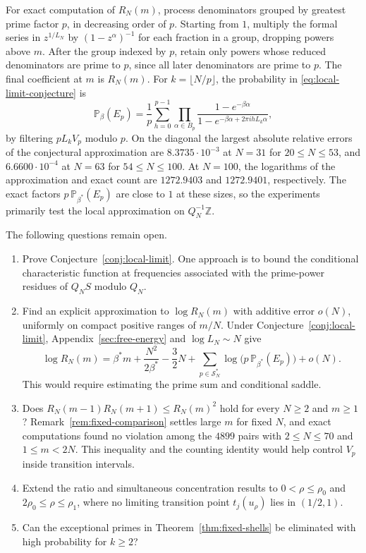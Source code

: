 \documentclass[11pt]{amsart}
\theoremstyle{remark}
\newcommand{\Pp}{\mathbb P}
\newcommand{\Z}{\mathbb Z}
\begin{document}
For exact computation of \(R_N(m)\), process denominators grouped by
greatest prime factor \(p\), in decreasing order of \(p\).
Starting from \(1\), multiply the formal series in \(z^{1/L_N}\)
by \((1-z^\alpha)^{-1}\) for each fraction
in a group, dropping powers above \(m\). After the group indexed by
\(p\), retain only powers whose reduced denominators are prime to \(p\),
since all later denominators are prime to \(p\). The final coefficient
at \(m\) is \(R_N(m)\). For \(k=\lfloor N/p\rfloor\), the probability
in \eqref{eq:local-limit-conjecture} is
\[
 \Pp_\beta(E_p)=\frac1p\sum_{h=0}^{p-1}
  \prod_{\alpha\in B_p}
  \frac{1-e^{-\beta\alpha}}{1-e^{-\beta\alpha+2\pi i hL_k\alpha}},
\]
by filtering \(pL_kV_p\) modulo \(p\).
On the diagonal the largest absolute relative errors of the
conjectural approximation are \(8.3735\cdot10^{-3}\) at \(N=31\)
for \(20\le N\le53\), and \(6.6600\cdot10^{-4}\) at \(N=63\) for
\(54\le N\le100\). At \(N=100\), the logarithms of the approximation
and exact count are \(1272.9403\) and \(1272.9401\), respectively.
The exact factors \(p\,\Pp_{\beta^\ast}(E_p)\) are close to \(1\) at
these sizes, so the experiments primarily test the local approximation
on \(Q_N^{-1}\Z\).

The following questions remain open.
\begin{enumerate}
\item Prove Conjecture~\ref{conj:local-limit}. One approach is to bound
the conditional characteristic function at frequencies associated
with the prime-power residues of \(Q_NS\) modulo \(Q_N\).
\item Find an explicit approximation to \(\log R_N(m)\) with additive
error \(o(N)\), uniformly on compact positive ranges of \(m/N\).
Under Conjecture~\ref{conj:local-limit}, Appendix~\ref{sec:free-energy} and \(\log L_N\sim N\) give
\[
 \log R_N(m)=\beta^\ast m+\frac{N^2}{2\beta^\ast}-\frac32N+
 \sum_{p\in\mathcal S_N^\ast}\log\!\bigl(p\,\Pp_{\beta^\ast}(E_p)\bigr)+o(N).
\]
This would require estimating the prime sum and conditional saddle.
\item Does \(R_N(m-1)R_N(m+1)\le R_N(m)^2\) hold for every \(N\ge2\)
and \(m\ge1\)? Remark~\ref{rem:fixed-comparison} settles large \(m\) for
fixed \(N\), and exact computations found no violation among the \(4899\)
pairs with \(2\le N\le70\) and \(1\le m<2N\). This inequality and the
counting identity would help control \(V_p\) inside transition intervals.
\item Extend the ratio and simultaneous concentration results to
\(0<\rho\le\rho_0\) and \(2\rho_0\le\rho\le\rho_1\), where no limiting
transition point \(t_j(u_\rho)\) lies in \((1/2,1)\).
\item Can the exceptional primes in Theorem~\ref{thm:fixed-shells}
be eliminated with high probability for \(k\ge2\)?
\end{enumerate}
\end{document}
